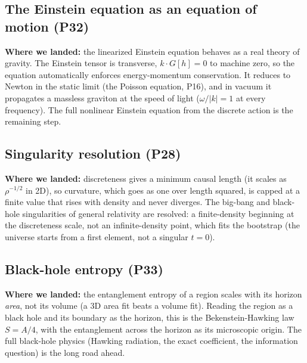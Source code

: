 \subsection{The Einstein equation as an equation of motion (P32)}

\textbf{Where we landed:} the linearized Einstein equation behaves as a real theory of
gravity. The Einstein tensor is transverse, $k \cdot G[h] = 0$ to machine zero, so the
equation automatically enforces energy-momentum conservation. It reduces to Newton in
the static limit (the Poisson equation, P16), and in vacuum it propagates a massless
graviton at the speed of light ($\omega/|k| = 1$ at every frequency). The full nonlinear
Einstein equation from the discrete action is the remaining step.

\subsection{Singularity resolution (P28)}

\textbf{Where we landed:} discreteness gives a minimum causal length (it scales as
$\rho^{-1/2}$ in 2D), so curvature, which goes as one over length squared, is capped at
a finite value that rises with density and never diverges. The big-bang and black-hole
singularities of general relativity are resolved: a finite-density beginning at the
discreteness scale, not an infinite-density point, which fits the bootstrap (the
universe starts from a first element, not a singular $t=0$).

\subsection{Black-hole entropy (P33)}

\textbf{Where we landed:} the entanglement entropy of a region scales with its horizon
\emph{area}, not its volume (a 3D area fit beats a volume fit). Reading the region as a
black hole and its boundary as the horizon, this is the Bekenstein-Hawking law
$S = A/4$, with the entanglement across the horizon as its microscopic origin. The full
black-hole physics (Hawking radiation, the exact coefficient, the information question)
is the long road ahead.
